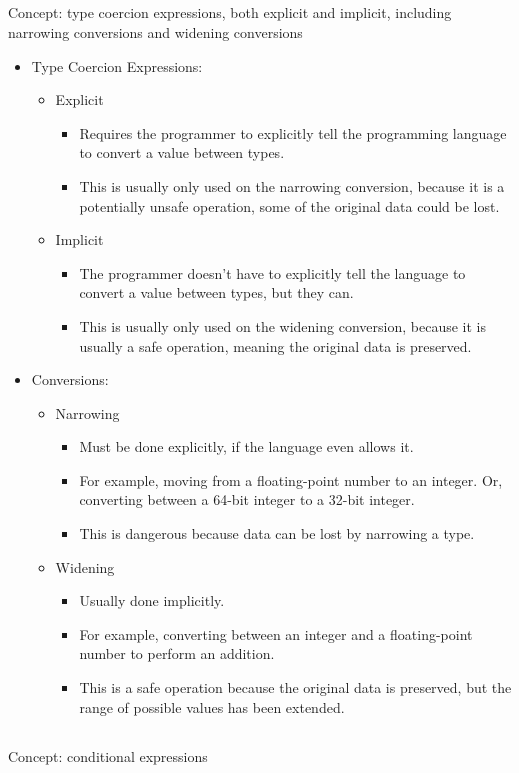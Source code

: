 \subsection{}
Concept: type coercion expressions, both explicit and implicit, including narrowing conversions and widening conversions

\begin{itemize}
\item Type Coercion Expressions:
  \begin{itemize}[noitemsep]
  \item Explicit
    \begin{itemize}[noitemsep]
    \item Requires the programmer to explicitly tell the programming language to convert a value between types.
    \item This is usually only used on the narrowing conversion, because it is a potentially unsafe operation, some of the original data could be lost.
    \end{itemize}
  \item Implicit
    \begin{itemize}[noitemsep]
    \item The programmer doesn't have to explicitly tell the language to convert a value between types, but they can.
    \item This is usually only used on the widening conversion, because it is usually a safe operation, meaning the original data is preserved.
    \end{itemize}
  \end{itemize}

\item Conversions:
  \begin{itemize}[noitemsep]
  \item Narrowing
    \begin{itemize}[noitemsep]
    \item Must be done explicitly, if the language even allows it.
    \item For example, moving from a floating-point number to an integer. Or, converting between a 64-bit integer to a 32-bit integer.
    \item This is dangerous because data can be lost by narrowing a type.
    \end{itemize}
  \item Widening
    \begin{itemize}[noitemsep]
    \item Usually done implicitly.
    \item For example, converting between an integer and a floating-point number to perform an addition.
    \item This is a safe operation because the original data is preserved, but the range of possible values has been extended.
    \end{itemize}
  \end{itemize}
\end{itemize}

\subsection{}
Concept: conditional expressions


